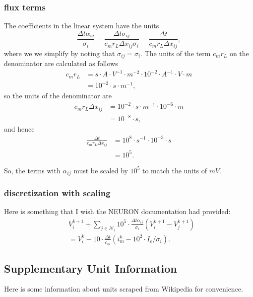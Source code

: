 \subsubsection{flux terms}
The coefficients in the linear system have the units
\begin{equation}
    \unit{ \frac{\Delta t\alpha_{ij}}{\sigma_i} }
    =
    \unit{ \frac{\Delta t \sigma_{ij} } {c_m r_L \Delta x_{ij} \sigma_i} }
    =
    \unit{ \frac{\Delta t } {c_m r_L \Delta x_{ij} } },
\end{equation}
where we we simplify by noting that $\unit{\sigma_{ij}}=\unit{\sigma_i}$.
The units of the term $c_m r_L$ on the denominator are calculated as follows
\begin{align}
    \unit{c_m r_L}
    &= s \cdot A \cdot V^{-1} \cdot m^{-2} \cdot 10^{-2} \cdot A^{-1} \cdot V \cdot m \nonumber \\
    &= 10^{-2} \cdot s \cdot m^{-1},
\end{align}
so the units of the denominator are
\begin{align}
    \unit{c_m r_L \Delta x_{ij}}
    &= 10^{-2} \cdot s \cdot m^{-1} \cdot 10^{-6} \cdot m \nonumber \\
    &= 10^{-8} \cdot s,
\end{align}
and hence
\begin{align}
    \unit{\frac{\Delta t } {c_m r_L \Delta x_{ij} }}
    &= 10^{8} \cdot s^{-1} \cdot 10^{-3} \cdot s \nonumber \\
    &= 10^{5}.
\end{align}

So, the terms with $\alpha_{ij}$ must be scaled by $10^5$ to match the units of $mV$.
\subsubsection{discretization with scaling}
Here is something that I wish the NEURON documentation had provided:
\begin{align}
&     V_i^{k+1} + \sum_{j\in\mathcal{N}_i} {10^5 \cdot \frac{\Delta t \alpha_{ij}}{\sigma_i} (V_i^{k+1}-V_j^{k+1})} \nonumber \\
&   = V_i^k - 10\cdot \frac{\Delta t}{c_m}(i_m^{k} - 10^2\cdot I_e/\sigma_i).
\end{align}
\subsection{Supplementary Unit Information}
Here is some information about units scraped from Wikipedia for convenience.

